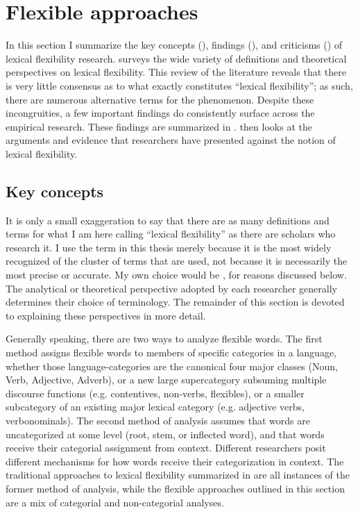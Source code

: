 \section{Flexible approaches}
\label{sec:2.3}

In this section I summarize the key concepts (), findings (), and criticisms () of lexical flexibility research.  surveys the wide variety of definitions and theoretical perspectives on lexical flexibility. This review of the literature reveals that there is very little consensus as to what exactly constitutes \enquote{lexical flexibility}; as such, there are numerous alternative terms for the phenomenon. Despite these incongruities, a few important findings do consistently surface across the empirical research. These findings are summarized in .  then looks at the arguments and evidence that researchers have presented against the notion of lexical flexibility.

\subsection{Key concepts}
\label{sec:2.3.1}

It is only a small exaggeration to say that there are as many definitions and terms for what I am here calling \enquote{lexical flexibility} as there are scholars who research it. I use the term  in this thesis merely because it is the most widely recognized of the cluster of terms that are used, not because it is necessarily the most precise or accurate. My own choice would be , for reasons discussed below. The analytical or theoretical perspective adopted by each researcher generally determines their choice of terminology. The remainder of this section is devoted to explaining these perspectives in more detail.

Generally speaking, there are two ways to analyze flexible words. The first method assigns flexible words to members of specific categories in a language, whether those language-categories are the canonical four major classes (Noun, Verb, Adjective, Adverb), or a new large supercategory subsuming multiple discourse functions (e.g. contentives, non-verbs, flexibles), or a smaller subcategory of an existing major lexical category (e.g. adjective verbs, verbonominals). The second method of analysis assumes that words are uncategorized at some level (root, stem, or inflected word), and that words receive their categorial assignment from context. Different researchers posit different mechanisms for how words receive their categorization in context. The traditional approaches to lexical flexibility summarized in  are all instances of the former method of analysis, while the flexible approaches outlined in this section are a mix of categorial and non-categorial analyses.

